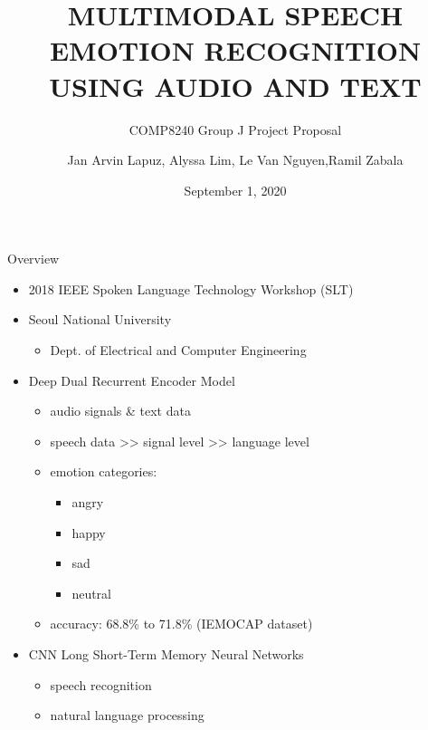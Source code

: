 \documentclass{beamer}
\title{MULTIMODAL SPEECH EMOTION RECOGNITION USING AUDIO AND TEXT}
\subtitle{COMP8240 Group J Project Proposal}
\author{Jan Arvin Lapuz, Alyssa Lim, Le Van Nguyen,\break Ramil Zabala}
\date{September 1, 2020}
\begin{document}
    \begin{frame}
        \maketitle
    \end{frame}
    
    \begin{frame}{Overview}
        \begin{itemize}
            \item 2018 IEEE Spoken Language Technology Workshop (SLT)
            \item Seoul National University
                \begin{itemize}
                    \item Dept. of Electrical and Computer Engineering
                \end{itemize}
            \item Deep Dual Recurrent Encoder Model
            \begin{itemize}
                \item audio signals \& text data
                \item speech data >> signal level >> language level
                \item emotion categories:
                \begin{itemize}
                    \item angry
                    \item happy
                    \item sad
                    \item neutral
                \end{itemize}
                \item accuracy: 68.8\% to 71.8\% (IEMOCAP dataset)
            \end{itemize}
            \item CNN Long Short-Term Memory Neural Networks
                \begin{itemize}
                    \item speech recognition
                    \item natural language processing
                \end{itemize}
        \end{itemize}
    \end{frame}
        
\end{document}
